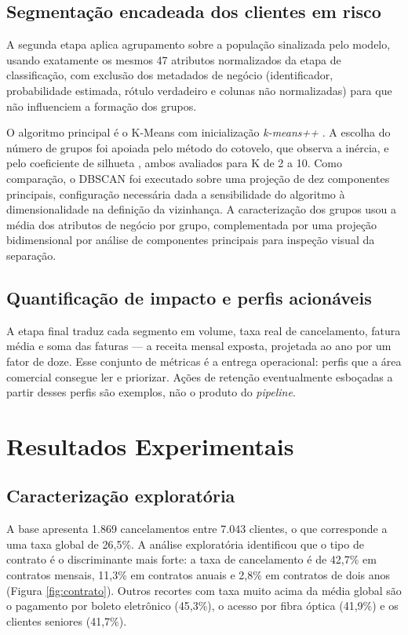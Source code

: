 \documentclass[12pt]{article}
\begin{document}
\subsection{Segmentação encadeada dos clientes em risco}
\label{sub:segmentacao}

A segunda etapa aplica agrupamento sobre a população sinalizada pelo modelo,
usando exatamente os mesmos 47 atributos normalizados da etapa de
classificação, com exclusão dos metadados de negócio (identificador,
probabilidade estimada, rótulo verdadeiro e colunas não normalizadas) para que
não influenciem a formação dos grupos.

O algoritmo principal é o K-Means com inicialização \textit{k-means++}
\cite{arthur2007}. A escolha do número de grupos foi apoiada pelo método do
cotovelo, que observa a inércia, e pelo coeficiente de silhueta
\cite{rousseeuw1987}, ambos avaliados para K de 2 a 10. Como comparação, o
DBSCAN \cite{ester1996} foi executado sobre uma projeção de dez componentes
principais, configuração necessária dada a sensibilidade do algoritmo à
dimensionalidade na definição da vizinhança. A caracterização dos grupos usou a
média dos atributos de negócio por grupo, complementada por uma projeção
bidimensional por análise de componentes principais para inspeção visual da
separação.

\subsection{Quantificação de impacto e perfis acionáveis}

A etapa final traduz cada segmento em volume, taxa real de cancelamento,
fatura média e soma das faturas --- a receita mensal exposta, projetada ao
ano por um fator de doze. Esse conjunto de métricas é a entrega operacional:
perfis que a área comercial consegue ler e priorizar. Ações de retenção
eventualmente esboçadas a partir desses perfis são exemplos, não o produto
do \textit{pipeline}.

\section{Resultados Experimentais}
\label{sec:4}

\subsection{Caracterização exploratória}
\label{sub:res-eda}

A base apresenta 1.869 cancelamentos entre 7.043 clientes, o que corresponde a
uma taxa global de 26,5\%. A análise exploratória identificou que o tipo de
contrato é o discriminante mais forte: a taxa de cancelamento é de 42,7\% em
contratos mensais, 11,3\% em contratos anuais e 2,8\% em contratos de dois anos
(Figura \ref{fig:contrato}). Outros recortes com taxa muito acima da média
global são o pagamento por boleto eletrônico (45,3\%), o acesso por fibra óptica
(41,9\%) e os clientes seniores (41,7\%).
\end{document}
